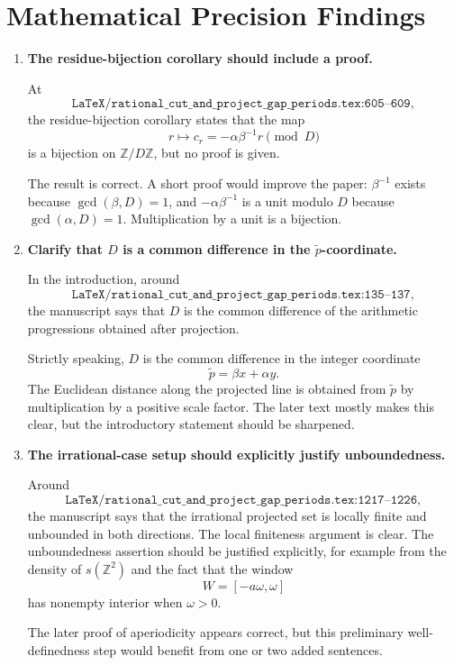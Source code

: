 \documentclass[11pt]{article}
\begin{document}
\section*{Mathematical Precision Findings}

\begin{enumerate}[label=\textbf{M\arabic*.},leftmargin=*]

\item \textbf{The residue-bijection corollary should include a proof.}

At
\[
\texttt{LaTeX/rational\_cut\_and\_project\_gap\_periods.tex:605--609},
\]
the residue-bijection corollary states that the map
\[
  r \mapsto c_r = -\alpha\beta^{-1}r \pmod D
\]
is a bijection on \(\mathbb Z/D\mathbb Z\), but no proof is given.

The result is correct.  A short proof would improve the paper:
\(\beta^{-1}\) exists because \(\gcd(\beta,D)=1\), and
\(-\alpha\beta^{-1}\) is a unit modulo \(D\) because
\(\gcd(\alpha,D)=1\).  Multiplication by a unit is a bijection.

\item \textbf{Clarify that \(D\) is a common difference in the
\(\tilde p\)-coordinate.}

In the introduction, around
\[
\texttt{LaTeX/rational\_cut\_and\_project\_gap\_periods.tex:135--137},
\]
the manuscript says that \(D\) is the common difference of the arithmetic
progressions obtained after projection.

Strictly speaking, \(D\) is the common difference in the integer coordinate
\[
  \tilde p = \beta x + \alpha y.
\]
The Euclidean distance along the projected line is obtained from
\(\tilde p\) by multiplication by a positive scale factor.  The later text
mostly makes this clear, but the introductory statement should be sharpened.

\item \textbf{The irrational-case setup should explicitly justify
unboundedness.}

Around
\[
\texttt{LaTeX/rational\_cut\_and\_project\_gap\_periods.tex:1217--1226},
\]
the manuscript says that the irrational projected set is locally finite and
unbounded in both directions.  The local finiteness argument is clear.  The
unboundedness assertion should be justified explicitly, for example from the
density of \(s(\mathbb Z^2)\) and the fact that the window
\[
  W=[-a\omega,\omega]
\]
has nonempty interior when \(\omega>0\).

The later proof of aperiodicity appears correct, but this preliminary
well-definedness step would benefit from one or two added sentences.


\end{enumerate}
\end{document}
